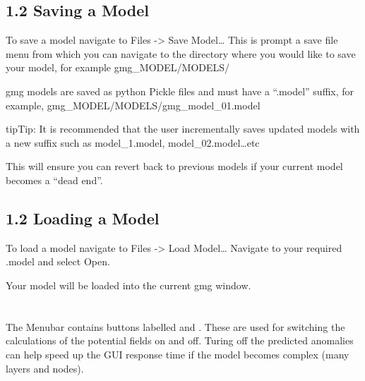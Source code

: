 \documentclass[a4paper,12pt,english]{sphinxmanual}
\begin{document}
\subsection{1.2 Saving a Model}
\label{\detokenize{manual__models:saving-a-model}}
To save a model navigate to Files -\textgreater{} Save Model…
This is prompt a save file menu from which you can navigate to the directory where you would like to save your model,
for example gmg\_MODEL/MODELS/

gmg models are saved as python Pickle files and must have a “.model” suffix, for example,
gmg\_MODEL/MODELS/gmg\_model\_01.model

\begin{sphinxadmonition}{tip}{Tip:}
It is recommended that the user incrementally saves updated models with a new suffix such as model\_1.model,
model\_02.model…etc
\end{sphinxadmonition}

This will ensure you can revert back to previous models if your current model becomes a “dead end”.

\begin{DUlineblock}{0em}
\item[] 
\end{DUlineblock}


\subsection{1.2 Loading a Model}
\label{\detokenize{manual__models:loading-a-model}}
To load a model navigate to Files -\textgreater{} Load Model…
Navigate to your required .model and select Open.

Your model will be loaded into the current gmg window.


\section{}
\label{\detokenize{manual__PF:potential-field-data}}\label{\detokenize{manual__PF::doc}}

\subsection{}
\label{\detokenize{manual__PF:potential-field-calculations}}
The Menubar contains buttons labelled  and .
These are used for switching the calculations of the potential fields on and off. Turing off the predicted anomalies
can help speed up the GUI response time if the model becomes complex (many layers and nodes).
\end{document}
